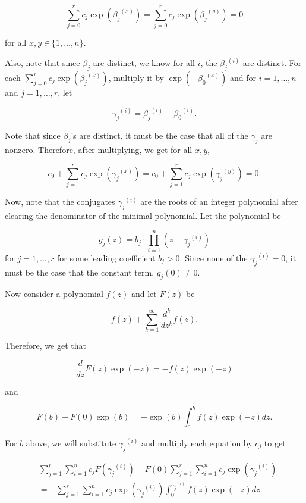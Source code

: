 \documentclass[a4paper, 11pt]{book}
\begin{document}
{    \[\sum\limits_{j=0}^{r}c_j \exp({\beta_j}^{(x)}) = \sum\limits_{j=0}^{r}c_j \exp({\beta_j}^{(y)}) = 0\]

    for all $x, y \in \{1, \ldots, n\}$.\par 

    Also, note that since $\beta_j$ are distinct, we know for all $i$, the ${\beta_{j}}^{(i)}$ are distinct. For each $\sum\limits_{j=0}^{r}c_j \exp({\beta_j}^{(x)})$, multiply it by $\exp(-{\beta_0}^{(x)})$ and for $i = 1, \ldots, n$ and $j = 1, \ldots, r$, let 

    \[{\gamma_j}^{(i)} = {\beta_j}^{(i)} - {\beta_0}^{(i)}.\]

    Note that since $\beta_j$'s are distinct, it must be the case that all of the $\gamma_j$ are nonzero. Therefore, after multiplying, we get for all $x, y$,

    \[c_0 + \sum\limits_{j=1}^{r} c_j\exp({\gamma_j}^{(x)}) = c_0 + \sum\limits_{j=1}^{r} c_j\exp({\gamma_j}^{(y)}) = 0.\]

    Now, note that the conjugates ${\gamma_j}^{(i)}$ are the roots of an integer polynomial after clearing the denominator of the minimal polynomial. Let the polynomial be 

    \[g_j(z) = b_j \cdot \prod\limits_{i=1}^{n} \left(z - {\gamma_j}^{(i)}\right)\] for $j = 1,\ldots, r$ for some leading coefficient $b_j > 0$. Since none of the ${\gamma_j}^{(i)} = 0$, it must be the case that the constant term, $g_j(0) \neq 0$.\par

    Now consider a polynomial $f(z)$ and let $F(z)$ be 

    \[f(z) + \sum\limits_{k=1}^{\infty} \frac{d^k}{dz^k}f(z).\]

    Therefore, we get that 

    \[\frac{d}{dz} F(z) \exp(-z) = -f(z) \exp(-z)\]

    and 

    \[F(b) - F(0)\exp(b) = -\exp(b) \int_{0}^{b}f(z)\exp(-z) dz.\]

    For $b$ above, we will substitute ${\gamma_j}^{(i)}$ and multiply each equation by $c_j$ to get

\begin{align*}
    &\sum\limits_{j=1}^{r} \sum\limits_{i=1}^{n} c_j F({\gamma_j}^{(i)}) - F(0) \sum\limits_{j=1}^{r} \sum\limits_{i=1}^{n} c_j\exp\left({\gamma_j}^{(i)}\right) \\
    &= - \sum\limits_{j=1}^{r} \sum\limits_{i=1}^{n} c_j\exp\left({\gamma_j}^{(i)}\right) \int_{0}^{{\gamma_j}^{(i)}} f(z) \exp(-z) dz
\end{align*}

}
\end{document}
